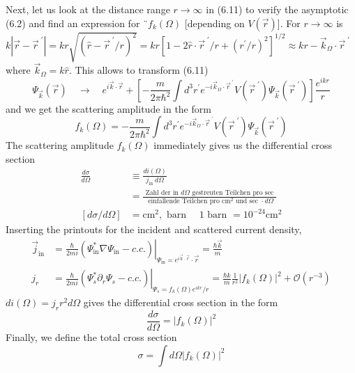 Next, let us look at the distance range $r \rightarrow \infty$ in (6.11) to verify the asymptotic (6.2) and find an expression for $¨ f_k (\Omega)$ [depending on $V (\vec{r})$]. For $r\rightarrow\infty$ is $k|\vec{r}-\vec{r}^{\;\prime}|=kr\sqrt{(\hat{r}-\vec{r}^{\;\prime}/r)^2}=kr[1-2\hat{r}\cdot\vec{r}^{\;\prime}/r+(r^{\prime}/r)^2]^{1/2}\approx kr-\vec{k}_{\Omega}\cdot\vec{r}^{\;\prime}$ where $\vec{k}_{\Omega}=k\hat{r}$. This allows to transform (6.11)
\begin{equation}
    \Psi_{\vec{k}}(\vec{r}) \quad \rightarrow \quad e^{i \vec{k} \cdot \vec{r}}+\left[-\frac{m}{2 \pi \hbar^{2}} \int d^{3} r^{\prime} e^{-i \vec{k}_{\Omega} \cdot \vec{r}^{\;\prime}} V\left(\vec{r}^{\;\prime}\right) \Psi_{\vec{k}}\left(\vec{r}^{\;\prime}\right)\right] \frac{e^{i k r}}{r}
    \end{equation}
and we get the scattering amplitude in the form
\begin{equation}
    f_{k}(\Omega)=-\frac{m}{2 \pi \hbar^{2}} \int d^{3} r^{\prime} e^{-i \vec{k}_{\Omega} \cdot \vec{r}^{\;\prime}} V\left(\vec{r}^{\;\prime}\right) \Psi_{\vec{k}}\left(\vec{r}^{\;\prime}\right)
    \end{equation}
The scattering amplitude $f_k (\Omega)$ immediately gives us the differential cross section
\begin{equation}
\begin{aligned} 
    \frac{d \sigma}{d \Omega} & \equiv \frac{d i(\Omega)}{j_{\text {in }} d \Omega} \\ 
    &=\frac{\text { Zahl der in } d \Omega \text { gestreuten Teilchen pro sec }}{\text { einfallende Teilchen pro } \mathrm{cm}^{2} \text { und sec } \cdot d \Omega} \\
    [d \sigma / d \Omega] &=\mathrm{cm}^{2}, \text { barn } \quad 1 \text { barn }=10^{-24} \mathrm{cm}^{2} \end{aligned}
%
\end{equation}
Inserting the printouts for the incident and scattered current density,
%
$$
\begin{aligned} \vec{j}_{\mathrm{in}} &=\left.\frac{\hbar}{2 m i}\left(\Psi_{\mathrm{in}}^{*} \nabla \Psi_{\mathrm{in}}-c . c .\right)\right|_{\Psi_{\mathrm{in}}=e^{i \vec{k} \cdot \vec{r}} \cdot \vec{r}}=\frac{\hbar \vec{k}}{m} \\ j_{r} &=\left.\frac{\hbar}{2 m i}\left(\Psi_{s}^{*} \partial_{r} \Psi_{s}-c . c .\right)\right|_{\Psi_{s}=f_{k}(\Omega) e^{i k r} / r}=\frac{\hbar k}{m} \frac{1}{r^{2}}\left|f_{k}(\Omega)\right|^{2}+\mathcal{O}\left(r^{-3}\right) \end{aligned}
$$
$d i (\Omega) = j_rr^2d\Omega$ gives the differential cross section in the form
%
\begin{equation}
    \frac{d \sigma}{d \Omega}=\left|f_{k}(\Omega)\right|^{2}
    \end{equation}
Finally, we define the total cross section
\begin{equation}
    \sigma=\int d \Omega\left|f_{k}(\Omega)\right|^{2}
    \end{equation}
